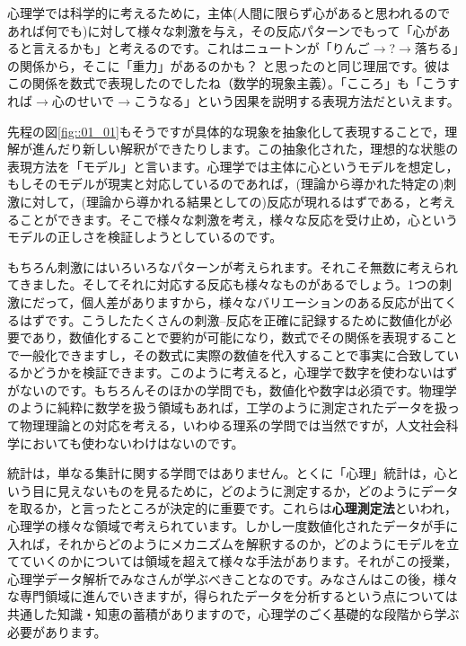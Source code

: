 \documentclass{book}
\makeatletter
\newcommand\keytermL[2]{\textbf{#1}\index{#2@#1}}
\makeatother
\begin{document}

心理学では科学的に考えるために，主体(人間に限らず心があると思われるのであれば何でも)に対して様々な刺激を与え，その反応パターンでもって「心があると言えるかも」と考えるのです。これはニュートンが「りんご$\to$?$\to$落ちる」の関係から，そこに「重力」があるのかも？ と思ったのと同じ理屈です。彼はこの関係を数式で表現したのでしたね（数学的現象主義）。「こころ」も「こうすれば$\to$心のせいで$\to$こうなる」という因果を説明する表現方法だといえます。

先程の図\ref{fig::01_01}もそうですが具体的な現象を抽象化して表現することで，理解が進んだり新しい解釈ができたりします。この抽象化された，理想的な状態の表現方法を「モデル」と言います。心理学では主体に心というモデルを想定し，もしそのモデルが現実と対応しているのであれば，(理論から導かれた特定の)刺激に対して，(理論から導かれる結果としての)反応が現れるはずである，と考えることができます。そこで様々な刺激を考え，様々な反応を受け止め，心というモデルの正しさを検証しようとしているのです。

もちろん刺激にはいろいろなパターンが考えられます。それこそ無数に考えられてきました。そしてそれに対応する反応も様々なものがあるでしょう。1つの刺激にだって，個人差がありますから，様々なバリエーションのある反応が出てくるはずです。こうしたたくさんの刺激--反応を正確に記録するために数値化が必要であり，数値化することで要約が可能になり，数式でその関係を表現することで一般化できますし，その数式に実際の数値を代入することで事実に合致しているかどうかを検証できます。このように考えると，心理学で数字を使わないはずがないのです。もちろんそのほかの学問でも，数値化や数字は必須です。物理学のように純粋に数学を扱う領域もあれば，工学のように測定されたデータを扱って物理理論との対応を考える，いわゆる理系の学問では当然ですが，人文社会科学においても使わないわけはないのです。

統計は，単なる集計に関する学問ではありません。とくに「心理」統計は，心という目に見えないものを見るために，どのように測定するか，どのようにデータを取るか，と言ったところが決定的に重要です。これらは\keytermL{心理測定法}{しんりそくていほう}といわれ，心理学の様々な領域で考えられています。しかし一度数値化されたデータが手に入れば，それからどのようにメカニズムを解釈するのか，どのようにモデルを立てていくのかについては領域を超えて様々な手法があります。それがこの授業，心理学データ解析でみなさんが学ぶべきことなのです。みなさんはこの後，様々な専門領域に進んでいきますが，得られたデータを分析するという点については共通した知識・知恵の蓄積がありますので，心理学のごく基礎的な段階から学ぶ必要があります。
\end{document}
